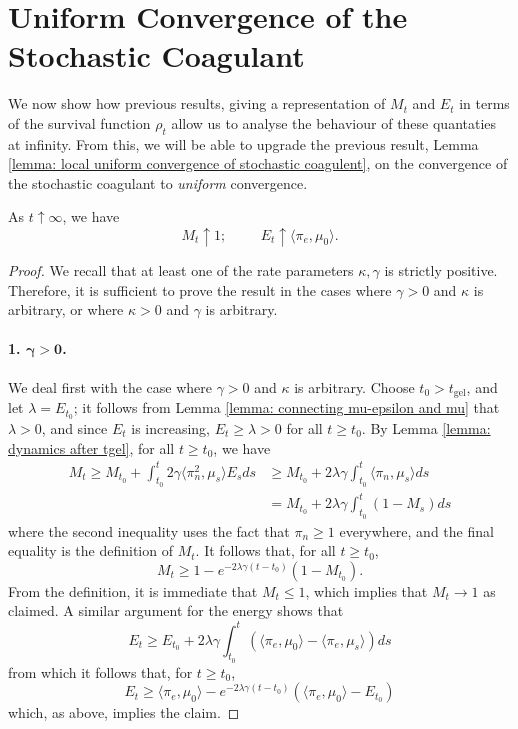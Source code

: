 \section{Uniform Convergence of the Stochastic Coagulant} We now show how previous results, giving a representation of $M_t$ and $E_t$ in terms of the survival function $\rho_t$ allow us to analyse the behaviour of these quantaties at infinity. From this, we will be able to upgrade the previous result, Lemma \ref{lemma: local uniform convergence of stochastic coagulent}, on the convergence of the stochastic coagulant to \emph{uniform} convergence. \begin{lemma}\label{lemma: M and E at infinity} As $t\uparrow \infty$, we have \begin{equation}
    M_t\uparrow 1; \hspace{1cm}E_t\uparrow \langle \pi_e, \mu_0\rangle.
\end{equation} \end{lemma} \begin{proof} We recall that at least one of the rate parameters $\kappa, \gamma$ is strictly positive. Therefore, it is sufficient to prove the result in the cases where $\gamma>0$ and $\kappa$ is arbitrary, or where $\kappa>0$ and $\gamma$ is arbitrary.
\paragraph{1. $\mathbf{\gamma>0}$.} We deal first with the case where $\gamma>0$ and $\kappa$ is arbitrary. Choose $t_0>t_\text{gel}$, and let $\lambda=E_{t_0}$; it follows from Lemma \ref{lemma: connecting mu-epsilon and mu} that $\lambda>0$, and since $E_t$ is increasing, $E_t\ge \lambda>0$ for all $t\ge t_0$. By Lemma \ref{lemma: dynamics after tgel}, for all $t\ge t_0$, we have \begin{equation} \begin{split} M_t\ge M_{t_0}+\int_{t_0}^t 2\gamma \langle \pi_n^2, \mu_s\rangle E_s ds & \ge M_{t_0}+2\lambda \gamma \int_{t_0}^t \langle \pi_n, \mu_s\rangle ds \\ & = M_{t_0}+2\lambda \gamma \int_{t_0}^t (1-M_s)ds\end{split}  \end{equation} where the second inequality uses the fact that $\pi_n \ge 1$ everywhere, and the final equality is the definition of $M_t$. It follows that, for all $t\ge t_0$, \begin{equation} M_t \ge 1-e^{-2\lambda \gamma (t-t_0)}(1-M_{t_0}). \end{equation} From the definition, it is immediate that $M_t\le 1$, which implies that $M_t\rightarrow 1$ as claimed. A similar argument for the energy shows that \begin{equation} E_t \ge E_{t_0} + 2\lambda \gamma  \int_{t_0}^t(\langle \pi_e, \mu_0\rangle -\langle \pi_e, \mu_s\rangle)ds\end{equation} from which it follows that, for $t\ge t_0$, \begin{equation} E_t\ge \langle \pi_e, \mu_0\rangle-e^{-2\lambda\gamma(t-t_0)}(\langle \pi_e, \mu_0\rangle - E_{t_0})  \end{equation}  which, as above, implies the claim.

\end{proof}
